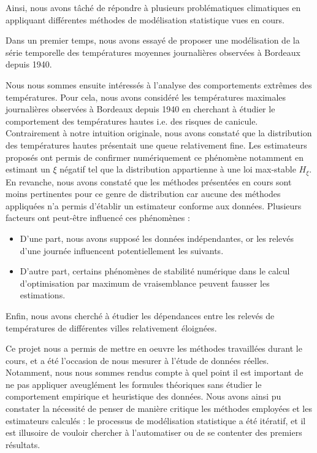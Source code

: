 \documentclass[../report.tex]{subfiles}
\begin{document}
\par Ainsi, nous avons tâché de répondre à plusieurs problématiques climatiques en appliquant différentes méthodes de modélisation statistique vues en cours.

\par Dans un premier temps, nous avons essayé de proposer une modélisation de la série temporelle des températures moyennes journalières observées à Bordeaux depuis 1940.

\par Nous nous sommes ensuite intéressés à l'analyse des comportements extrêmes des températures. Pour cela, nous avons considéré les températures maximales journalières observées à Bordeaux depuis 1940 en cherchant à étudier le comportement des températures hautes i.e. des risques de canicule. Contrairement à notre intuition originale, nous avons constaté que la distribution des températures hautes présentait une queue relativement fine. Les estimateurs proposés ont permis de confirmer numériquement ce phénomène notamment en estimant un $\xi$ négatif tel que la distribution appartienne à une loi max-stable $H_{\xi}$. En revanche, nous avons constaté que les méthodes présentées en cours sont moins pertinentes pour ce genre de distribution car aucune des méthodes appliquées n'a permis d'établir un estimateur conforme aux données. Plusieurs facteurs ont peut-être influencé ces phénomènes : 
\begin{itemize}
\item D'une part, nous avons supposé les données indépendantes, or les relevés d'une journée influencent potentiellement les suivants.
\item D'autre part, certains phénomènes de stabilité numérique dans le calcul d'optimisation par maximum de vraisemblance peuvent fausser les estimations.
\end{itemize}

\par Enfin, nous avons cherché à étudier les dépendances entre les relevés de températures de différentes villes relativement éloignées.

\vspace{5mm}

\par Ce projet nous a permis de mettre en oeuvre les méthodes travaillées durant le cours, et a été l'occasion de nous mesurer à l'étude de données réelles. Notamment, nous nous sommes rendus compte à quel point il est important de ne pas appliquer aveuglément les formules théoriques sans étudier le comportement empirique et heuristique des données. Nous avons ainsi pu constater la nécessité de penser de manière critique les méthodes employées et les estimateurs calculés : le processus de modélisation statistique a été itératif, et il est illusoire de vouloir chercher à l'automatiser ou de se contenter des premiers résultats.
\end{document}
